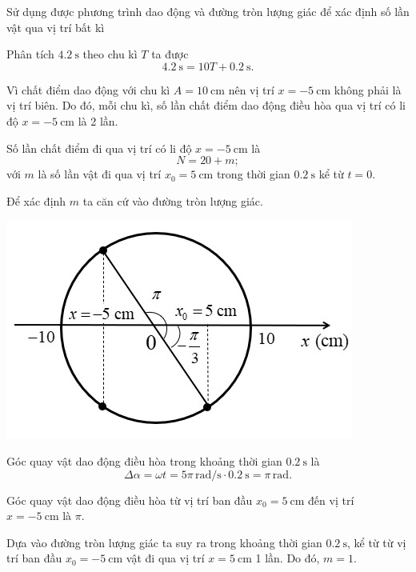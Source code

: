 \begin{dang}{Sử dụng được phương trình dao động và đường tròn lượng giác để xác định số lần vật qua vị trí bất kì}
{		Phân tích $\SI{4,2}{\second}$ theo chu kì $T$ ta được 
		\begin{equation*}
			\SI{4,2}{\second}=10T+\SI{0,2}{\second}.
		\end{equation*}
		
		Vì chất điểm dao động với chu kì $A=\SI{10}{\centi\meter}$ nên vị trí $x=\SI{-5}{\centi\meter}$ không phải là vị trí biên. Do đó, mỗi chu kì, số lần chất điểm dao động điều hòa qua vị trí có li độ $x=\SI{-5}{\centi\meter}$ là 2 lần.
		
		Số lần chất điểm đi qua vị trí có li độ $x=\SI{-5}{\centi\meter}$ là
		\begin{equation*}
			N=20+m;
		\end{equation*}
		với $m$ là số lần vật đi qua vị trí $x_0=\SI{5}{\centi\meter}$ trong thời gian $\SI{0,2}{\second}$ kể từ $t=0$.
		
		Để xác định $m$ ta căn cứ vào đường tròn lượng giác.
		
		\begin{center}
			\includegraphics[scale=0.8]{../figs/VN12-PH-02-A-001-4-V2-7.jpg}
		\end{center}
		
		Góc quay vật dao động điều hòa trong khoảng thời gian $\SI{0,2}{\second}$ là
		\begin{equation*}
			\Delta\alpha=\omega t=5\pi\,\text{rad/s}\cdot\SI{0,2}{\second}=\pi\,\text{rad}.
		\end{equation*}
		
		Góc quay vật dao động điều hòa từ vị trí ban đầu $x_0=\SI{5}{\centi\meter}$ đến vị trí $x=\SI{-5}{\centi\meter}$ là $\pi$.
		
		Dựa vào đường tròn lượng giác ta suy ra trong khoảng thời gian $\SI{0,2}{\second}$, kể từ từ vị trí ban đầu $x_0=\SI{-5}{\centi\meter}$ vật đi qua vị trí  $x=\SI{5}{\centi\meter}$ 1 lần. Do đó, $m=1$.
		
}
\end{dang}
